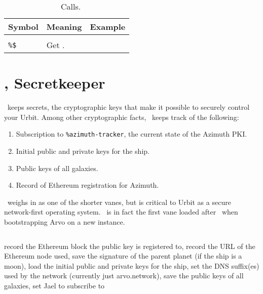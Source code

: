 \begin{table}[h!]
  \begin{center}
    \caption{\iris~\dotket~Calls.}
    \label{ha:iris}
    \begin{tabular}{lll}
      Symbol & Meaning & Example \\
      \hline \\
      \texttt{\%\$} & Get . & \\  %
    \end{tabular}
  \end{center}
\end{table}

\section[\jael]{\jael, Secretkeeper}


\jael~keeps secrets, the cryptographic keys that make it possible to securely control your Urbit.  Among other cryptographic facts, \jael~keeps track of the following:

\begin{enumerate}
  \item  Subscription to \texttt{\%azimuth-tracker}, the current state of the Azimuth PKI.
  \item  Initial public and private keys for the ship.
  \item  Public keys of all galaxies.
  \item  Record of Ethereum registration for Azimuth.
\end{enumerate}

\jael~weighs in as one of the shorter vanes, but is critical to Urbit as a secure network-first operating system.  \jael~is in fact the first vane loaded after \dill~when bootstrapping Arvo on a new instance.

\begin{lstlisting}

\end{lstlisting}


record the Ethereum block the public key is registered to,
record the URL of the Ethereum node used,
save the signature of the parent planet (if the ship is a moon),
load the initial public and private keys for the ship,
set the DNS suffix(es) used by the network (currently just arvo.network),
save the public keys of all galaxies,
set Jael to subscribe to %

